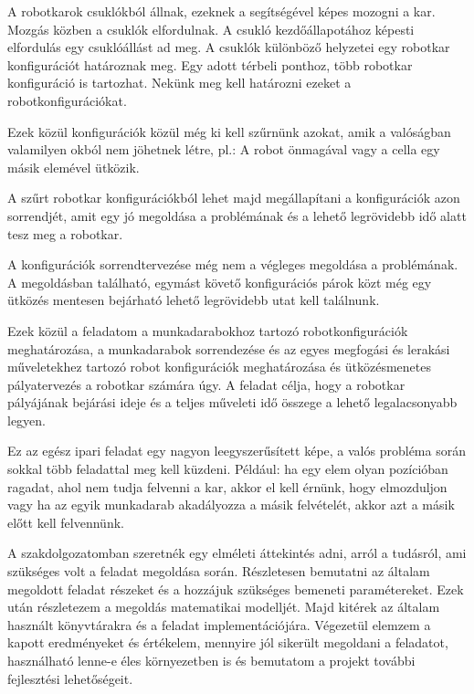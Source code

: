 A robotkarok csuklókból állnak, ezeknek a segítségével képes mozogni a kar. Mozgás közben a csuklók elfordulnak. A csukló kezdőállapotához képesti elfordulás egy csuklóállást ad meg. A csuklók különböző helyzetei egy robotkar konfigurációt határoznak meg. Egy adott térbeli ponthoz, több robotkar konfiguráció is tartozhat. Nekünk meg kell határozni ezeket a robotkonfigurációkat.



Ezek közül konfigurációk közül még ki kell szűrnünk azokat, amik a valóságban valamilyen okból nem jöhetnek létre, pl.: A robot önmagával vagy a cella egy másik elemével ütközik.

A szűrt robotkar konfigurációkból lehet majd megállapítani a konfigurációk azon sorrendjét, amit egy jó megoldása a problémának és a lehető legrövidebb idő alatt tesz meg a robotkar. 

A konfigurációk sorrendtervezése még nem a végleges megoldása a problémának. A megoldásban található, egymást követő konfigurációs párok közt még egy ütközés mentesen  bejárható lehető legrövidebb utat kell találnunk.

Ezek közül a feladatom a munkadarabokhoz tartozó robotkonfigurációk meghatározása, a munkadarabok sorrendezése és az egyes megfogási és lerakási műveletekhez tartozó robot konfigurációk meghatározása és ütközésmenetes pályatervezés a robotkar számára úgy. A feladat célja, hogy a robotkar pályájának bejárási ideje és a teljes műveleti idő összege a lehető legalacsonyabb legyen.

Ez az egész ipari feladat egy nagyon leegyszerűsített képe, a valós probléma során sokkal több feladattal meg kell küzdeni. Például: ha egy elem olyan pozícióban ragadat, ahol nem tudja felvenni a kar, akkor el kell érnünk, hogy elmozduljon vagy ha az egyik munkadarab akadályozza a másik felvételét, akkor azt a másik előtt kell felvennünk.

A szakdolgozatomban szeretnék egy elméleti áttekintés adni, arról a tudásról, ami szükséges volt a feladat megoldása során. Részletesen bemutatni az általam megoldott feladat részeket és a hozzájuk szükséges bemeneti paramétereket. Ezek után részletezem a megoldás matematikai modelljét. Majd kitérek az általam használt könyvtárakra és a feladat implementációjára. Végezetül elemzem a kapott eredményeket és értékelem, mennyire jól sikerült megoldani a feladatot, használható lenne-e éles környezetben is és bemutatom a projekt további fejlesztési lehetőségeit.
